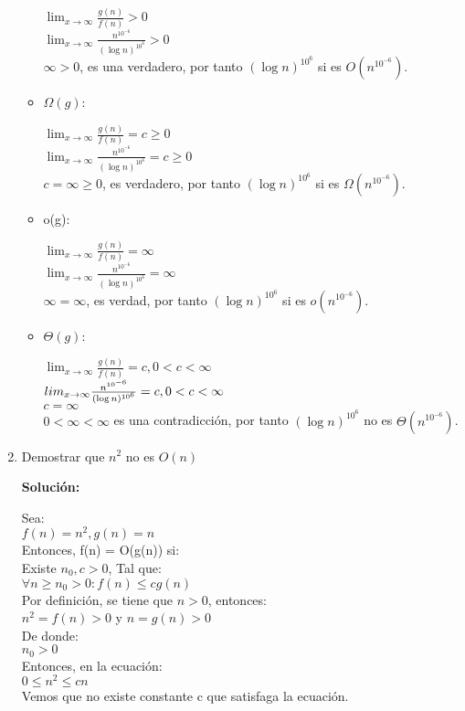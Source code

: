 \documentclass{article}
\begin{document}
\begin{enumerate}[label=\textbf{\alph*.}]
\begin{itemize}
        $\lim_{x\to\infty} \frac{g(n)}{f(n)}>0$\\
        $\lim_{x\to\infty} \frac{n^{10^{-6}}}{(\log n)^{10^6}}>0$\\
        $\infty>0$, es una verdadero, por tanto $(\log n)^{10^6}$ si es $O(n^{10^{-6}})$.

      \item $\Omega(g)$:
      
        $\lim_{x\to\infty} \frac{g(n)}{f(n)}=c \geq 0$\\
        $\lim_{x\to\infty} \frac{n^{10^{-6}}}{(\log n)^{10^6}}=c \geq 0$\\
        $c=\infty \geq 0$, es verdadero, por tanto $(\log n)^{10^6}$ si es $\Omega(n^{10^{-6}})$.

      \item o(g):
      
        $\lim_{x\to\infty} \frac{g(n)}{f(n)}=\infty$\\
        $\lim_{x\to\infty} \frac{n^{10^{-6}}}{(\log n)^{10^6}}=\infty$\\
        $\infty=\infty$, es verdad, por tanto $(\log n)^{10^6}$ si es $o(n^{10^{-6}})$.

      \item $\Theta(g)$:
      
        $\lim_{x\to\infty} \frac{g(n)}{f(n)}=c,0<c<\infty$\\
        $\\lim_{x\to\infty} \frac{n^{10^{-6}}}{(\log n)^{10^6}}=c,0<c<\infty$\\
        $c=\infty$\\
	$0<\infty<\infty$ es una contradicción, por tanto $(\log n)^{10^6}$ no es $\Theta(n^{10^{-6}})$.
    \end{itemize}
  
  
  \item Demostrar que $n^2$ no es $O(n)$
  
  \textbf{Solución:}
  
  Sea: \\
  $f(n) = n^2,  g(n) = n$\\
  Entonces, f(n) = O(g(n)) si:\\
  Existe $n_0, c > 0$, Tal que:\\
  $\forall n \geq n_0 > 0 : f(n) \leq cg(n)$\\
  
  Por definición, se tiene que $n > 0$, entonces:\\
  $n^2=f(n) > 0$ y $n=g(n) > 0$\\
  De donde:\\
  $n_0 > 0$\\
  Entonces, en la ecuación:\\
  $0 \leq n^2 \leq cn$\\
  Vemos que no existe constante c que satisfaga la ecuación. 
  

\end{enumerate}
\end{document}

